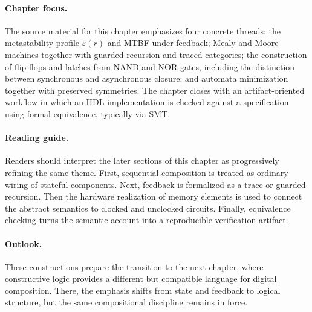 \documentclass[11pt]{article}
\begin{document}
\paragraph{Chapter focus.} The source material for this chapter emphasizes four concrete threads: the metastability profile \(\varepsilon(r)\) and MTBF under feedback; Mealy and Moore machines together with guarded recursion and traced categories; the construction of flip-flops and latches from NAND and NOR gates, including the distinction between synchronous and asynchronous closure; and automata minimization together with preserved symmetries. The chapter closes with an artifact-oriented workflow in which an HDL implementation is checked against a specification using formal equivalence, typically via SMT.

\paragraph{Reading guide.} Readers should interpret the later sections of this chapter as progressively refining the same theme. First, sequential composition is treated as ordinary wiring of stateful components. Next, feedback is formalized as a trace or guarded recursion. Then the hardware realization of memory elements is used to connect the abstract semantics to clocked and unclocked circuits. Finally, equivalence checking turns the semantic account into a reproducible verification artifact.

\paragraph{Outlook.} These constructions prepare the transition to the next chapter, where constructive logic provides a different but compatible language for digital composition. There, the emphasis shifts from state and feedback to logical structure, but the same compositional discipline remains in force.
\end{document}
